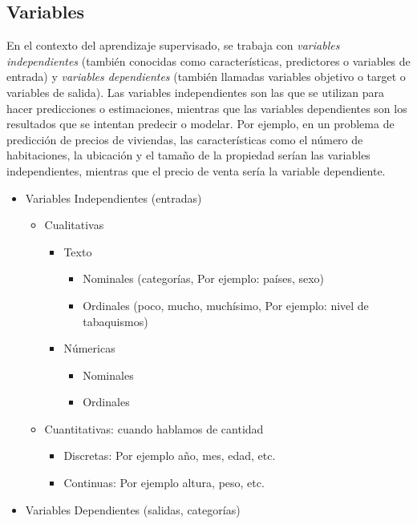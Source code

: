 \documentclass[../main.tex]{subfiles}
\begin{document}
    \subsection{Variables}
        En el contexto del aprendizaje supervisado, se trabaja con \textit{variables independientes} (también conocidas como características, predictores o variables de entrada) y \textit{variables dependientes} (también llamadas variables objetivo o target o variables de salida). Las variables independientes son las que se utilizan para hacer predicciones o estimaciones, mientras que las variables dependientes son los resultados que se intentan predecir o modelar. Por ejemplo, en un problema de predicción de precios de viviendas, las características como el número de habitaciones, la ubicación y el tamaño de la propiedad serían las variables independientes, mientras que el precio de venta sería la variable dependiente.

        \begin{itemize}
            \item Variables Independientes (entradas)
                \begin{itemize}
                    \item Cualitativas
                        \begin{itemize}
                            \item Texto
                                \begin{itemize}
                                    \item Nominales (categorías, Por ejemplo: países, sexo)
                                    \item Ordinales (poco, mucho, muchísimo, Por ejemplo: nivel de tabaquismos)
                                    
                                \end{itemize}
                            \item Númericas
                                \begin{itemize}
                                    \item Nominales
                                    \item Ordinales
                                \end{itemize}
                        \end{itemize}
                    \item Cuantitativas: cuando hablamos de cantidad
                        \begin{itemize}
                            \item Discretas: Por ejemplo año, mes, edad, etc.
                            \item Continuas: Por ejemplo altura, peso, etc.
                        \end{itemize}
                \end{itemize}
            \item Variables Dependientes (salidas, categorías)
        \end{itemize}
        
\end{document}
